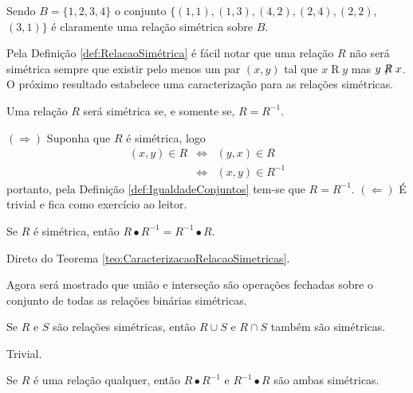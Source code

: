 \begin{exemplo}
	Sendo $B = \{1, 2, 3, 4\}$ o conjunto $\{(1, 1), (1, 3), (4, 2), (2, 4), (2, 2),$  $(3, 1)\}$ é claramente uma relação simétrica sobre $B$.
\end{exemplo}

Pela Definição \ref{def:RelacaoSimétrica} é fácil notar que uma relação $R$ não será simétrica sempre que existir pelo menos um par $(x, y)$ tal que $x \mathrel{R} y$ mas $y \centernot{R} x$. O próximo resultado estabelece uma caracterização para as relações simétricas.

\begin{teorema}\label{teo:CaracterizacaoRelacaoSimetricas}
	Uma relação $R$ será simétrica se, e somente se, $R = R^{-1}$.
\end{teorema}

\begin{prova}
	$(\Rightarrow)$ Suponha que $R$ é simétrica, logo
	\begin{eqnarray*}
		(x, y) \in R & \Longleftrightarrow & (y, x) \in R\\
		& \Longleftrightarrow & (x, y) \in R^{-1}
	\end{eqnarray*}
	portanto, pela Definição \ref{def:IgualdadeConjuntos} tem-se que $R = R^{-1}$. $(\Leftarrow)$ É trivial e fica como exercício ao leitor.
\end{prova}


\begin{corolario}
	Se $R$ é simétrica, então $R \bullet R^{-1} = R^{-1} \bullet R$.
\end{corolario}

\begin{prova}
	Direto do Teorema \ref{teo:CaracterizacaoRelacaoSimetricas}.
\end{prova}

Agora será mostrado que união e interseção são operações fechadas sobre o conjunto de todas as relações binárias simétricas.

\begin{teorema}\label{teo:FechamentoSimetricas}
	Se $R$ e $S$ são relações simétricas, então $R \cup S$ e $R \cap S$ também são simétricas.
\end{teorema}

\begin{prova}
	Trivial.
\end{prova}

\begin{teorema}
	Se $R$ é uma relação qualquer, então $R \bullet R^{-1}$ e  $R^{-1} \bullet R$ são ambas simétricas.
\end{teorema}

